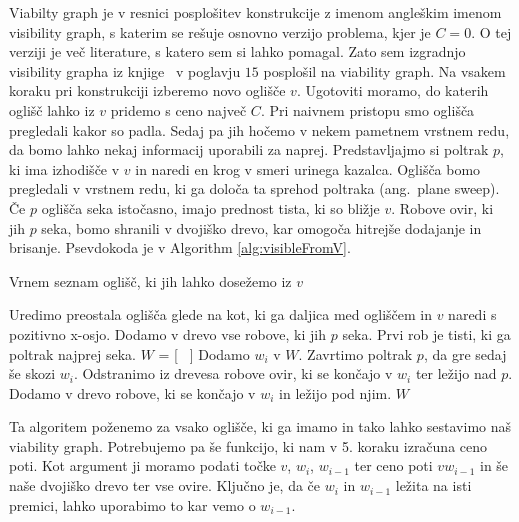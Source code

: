 \documentclass{article}
\begin{document}
Viabilty graph je v resnici posplošitev konstrukcije z imenom angleškim imenom visibility graph, s katerim se rešuje osnovno verzijo problema, kjer je $C = 0$. O tej verziji je več literature, s katero sem si lahko pomagal. Zato sem izgradnjo visibility grapha iz knjige~\cite{BCKO} v poglavju $15$ posplošil na viability graph. 
Na vsakem koraku pri konstrukciji izberemo novo oglišče $v$. Ugotoviti moramo, do katerih oglišč lahko iz $v$ pridemo s ceno največ $C$. Pri naivnem pristopu smo oglišča pregledali kakor so padla. Sedaj pa jih hočemo v nekem pametnem vrstnem redu, da bomo lahko nekaj informacij uporabili za naprej. Predstavljajmo si poltrak $p$, ki ima izhodišče v $v$ in naredi en krog v smeri urinega kazalca. Oglišča bomo pregledali v vrstnem redu, ki ga določa ta sprehod poltraka (ang.\ plane sweep). Če $p$ oglišča seka istočasno, imajo prednost tista, ki so bližje $v$. Robove ovir, ki jih $p$ seka, bomo shranili v dvojiško drevo, kar omogoča hitrejše dodajanje in brisanje. Psevdokoda je v Algorithm \ref{alg:visibleFromV}.

\begin{algorithm}
    \caption{Vrnem seznam oglišč, ki jih lahko dosežemo iz $v$}
    \label{alg:visibleFromV}
    \begin{algorithmic}[1]
        \State Uredimo preostala oglišča glede na kot, ki ga daljica med ogliščem in $v$ naredi s pozitivno x-osjo.
        \State  Dodamo v drevo vse robove, ki jih $p$ seka. Prvi rob je tisti, ki ga poltrak najprej seka.
        \State $W$ = [ \ ]
            \State Dodamo $w_i$ v $W$.
        \EndIf
        \State Zavrtimo poltrak $p$, da gre sedaj še skozi $w_i$.
        \State Odstranimo iz drevesa robove ovir, ki se končajo v $w_i$ ter ležijo nad $p$.
        \State Dodamo v drevo robove, ki se končajo v $w_i$ in ležijo pod njim.
        \EndFor
        \State \Return $W$
    \end{algorithmic}
\end{algorithm}

Ta algoritem poženemo za vsako oglišče, ki ga imamo in tako lahko sestavimo naš viability graph. Potrebujemo pa še funkcijo, ki nam v 5. koraku izračuna ceno poti. Kot argument ji moramo podati točke $v$, $w_i$, $w_{i-1}$ ter ceno poti $vw_{i-1}$ in še naše dvojiško drevo ter vse ovire. Ključno je, da če $w_i$ in $w_{i-1}$ ležita na isti premici, lahko uporabimo to kar vemo o $w_{i-1}$.
\end{document}

